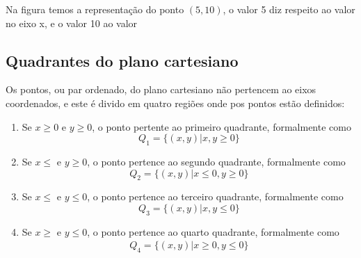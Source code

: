 \begin{multicols*}{2}
    Na figura temos a representação do ponto $(5,10)$, o valor 5 diz respeito ao valor no eixo x, e o valor 10 ao valor
    \subsection*{Quadrantes do plano cartesiano}
    Os pontos, ou par ordenado, do plano cartesiano não pertencem ao eixos coordenados, e este é divido em quatro regiões onde pos pontos estão definidos:
    \begin{enumerate}[wide, labelwidth=!, labelindent=0pt]
        \item Se $x \ge 0$ e $y \ge 0$, o ponto pertente ao primeiro quadrante, formalmente como
            \[
                Q_1 = \{ (x,y)| x,y \ge 0 \} 
            \]
        \item Se $x \le $ e $ y \ge 0 $, o ponto pertence ao segundo quadrante, formalmente como
            \[
                Q_2 = \{  (x,y) | x \le 0, y \ge 0 \}
            \]

        \item Se $x \le $ e $ y \le 0 $, o ponto pertence ao terceiro quadrante, formalmente como
            \[
                Q_3 = \{  (x,y) | x , y \le 0 \}
            \]

        \item Se $x \ge $ e $ y \le 0 $, o ponto pertence ao quarto quadrante, formalmente como
              \begin{align*}
                  Q_4 = \{  (x,y) | x \ge 0 ,y \le 0 \}
              \end{align*}
    \end{enumerate}


\end{multicols*}
